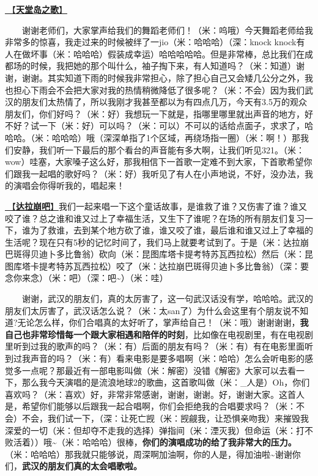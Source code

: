 \documentclass[]{ctexbook}
\begin{document}
\hyperref[haven-song]{🎵【\textbf{天堂岛之歌}】}

  谢谢老师们，大家掌声给我们的舞蹈老师们！（米：呜哦）今天舞蹈老师给我非常多的惊喜，我走过来的时候被绊了一jio（米：哈哈哈）（深：knock knock有人在做坏事（米：哈哈哈）假装成幸运）哈哈哈哈哈。但是非常棒，总比我们在成都场的时候，我把她的那个叫什么，袖子掏下来，有人知道吗？（米：知道）谢谢，谢谢。其实知道下雨的时候我非常担心，除了担心自己又会矮几公分之外，我也担心下雨会不会把大家对我的热情稍微降低了很多呢？（米：不会）因为我们武汉的朋友们太热情了，所以我刚才我甚至都以为有四点几万，今天有3.5万的观众朋友们，你们好吗？（米：好）我想玩一下就是，指哪里哪里就出声音的地方，好不好？试一下（米：好）可以吗？（米：可以）不可以的话给点面子，求求了，哈哈哈。（米：哈哈哈）哦（深深单指了1个区域，再绕场指一圈）（米：啊！）那我们安静，我们听一下最后的那个看台的声音能有多大啊，让我们听见321。（米：wow）哇塞，大家嗓子这么好，那我相信下一首歌一定难不到大家，下首歌希望你们跟我一起唱的歌好吗？（米：好）我听见了有人在小声地说，不好，没办法，我的演唱会你得听我的，唱起来！

\hyperref[dalabengba]{🎵【\textbf{达拉崩吧}】}我们一起来唱一下这个童话故事，是谁救了谁？又伤害了谁？谁又咬了谁？总之谁和谁又过上了幸福生活，又生下了谁呢？在场的所有朋友们复习一下，谁为了救谁，去到某个地方砍了谁，谁又咬了谁，最后谁和谁又过上了幸福的生活呢？现在只有5秒的记忆时间了，我们马上就要考试到了。于是（米：达拉崩巴斑得贝迪卜多比鲁翁）砍向（米：昆图库塔卡提考特苏瓦西拉松）然后（米：昆图库塔卡提考特苏瓦西拉松）咬了（米：达拉崩巴斑得贝迪卜多比鲁翁）（深：要念你来念）（米：吧）（深：吧\textasciitilde）（米：哇）

  谢谢，武汉的朋友们，真的太厉害了，这一句武汉话没有学，哈哈哈。武汉的朋友们太厉害了，武汉话怎么说？（米：太san了）为什么会这里有个朋友说不知道?无论怎么样，你们合唱真的太好听了，掌声给自己！（米：哦）谢谢谢谢，\textbf{我自己也非常珍惜每一个跟大家相遇和陪伴的时刻}，比如像在电视剧里，有在电视剧里听到过我的歌声的吗？（米：有）后面的朋友有吗？（米：有）有在电影里面听到过我声音的吗？（米：有）看来电影是要多唱啊（米：哈哈）怎么会听电影的感觉多一点呢？那最近有一部电影叫做（米：解密）没错《解密》大家可以去看一下，那么我今天演唱的是流浪地球2的歌曲，这首歌叫做（米：\_人是）Oh，你们喜欢吗？（米：喜欢）好，非常非常感谢，谢谢，谢谢。好，谢谢大家。这首人是，希望你们能够以后跟我一起合唱啊，你们会拒绝我的合唱要求吗？（米：不会）不会，我们试一下，（深：让死亡觊（米：觊觎我，让恐惧亲吻我）来摧毁我深爱的一切（米：但却夺不走我的选择）弹指间（米：湮灭我）但命运（米：打不败活着））哦\textasciitilde（米：哈哈哈）很棒，\textbf{你们的演唱成功的给了我非常大的压力。}（米：哈哈哈）那我就只能够说，周深啊加油啊，你的人是，得加油啦\textasciitilde 谢谢你们，\textbf{武汉的朋友们真的太会唱歌啦。}
\end{document}
